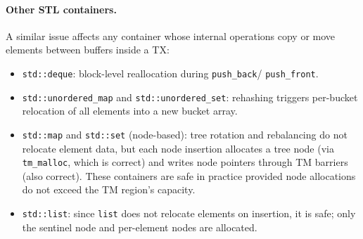 \documentclass[article,12pt]{article}
\begin{document}
\paragraph{Other STL containers.}
A similar issue affects any container whose internal operations copy or move
elements between buffers inside a TX:
\begin{itemize}
\item \texttt{std::deque}: block-level reallocation during \texttt{push\_back}/
  \texttt{push\_front}.
\item \texttt{std::unordered\_map} and \texttt{std::unordered\_set}: rehashing
  triggers per-bucket relocation of all elements into a new bucket array.
\item \texttt{std::map} and \texttt{std::set} (node-based): tree rotation and
  rebalancing do not relocate element data, but each node insertion allocates
  a tree node (via \texttt{tm\_malloc}, which is correct) and writes node
  pointers through TM barriers (also correct).  These containers are safe in
  practice provided node allocations do not exceed the TM region's capacity.
\item \texttt{std::list}: since \texttt{list} does not relocate elements on
  insertion, it is safe; only the sentinel node and per-element nodes are
  allocated.
\end{itemize}
\end{document}
